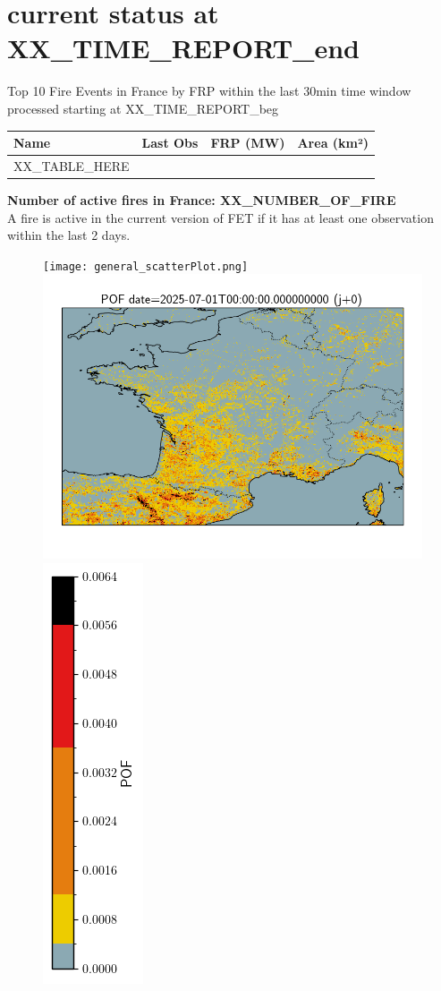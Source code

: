 \documentclass{article}
\begin{document}
\vspace*{-1.5cm} %
\noindent
{}
\vspace{1cm} %

\section{current status at XX_TIME_REPORT_end}
Top 10 Fire Events in France by FRP within the last 30min time window processed starting at XX_TIME_REPORT_beg
\begin{table}[H]
\centering
\begin{tabular}{llcc}
\toprule
\textbf{Name} & \textbf{Last Obs} & \textbf{FRP (MW)} & \textbf{Area (km²)} \\
\midrule
XX_TABLE_HERE
\bottomrule
\end{tabular}
\end{table}
\textbf{Number of active fires in France: XX_NUMBER_OF_FIRE } \\
A fire is active in the current version of FET if it has at least one observation within the last 2 days.
\vspace{-1em}
\begin{figure}[H]
    \centering
    \begin{minipage}{\linewidth}
        \texttt{[image: general\_scatterPlot.png]}%
        \includegraphics[width=0.47\linewidth]{general_pof_j0.png}%
        \includegraphics[width=0.059\linewidth]{general_pof_j0_colorbar.png}
    \end{minipage}
\end{figure}
\end{document}
